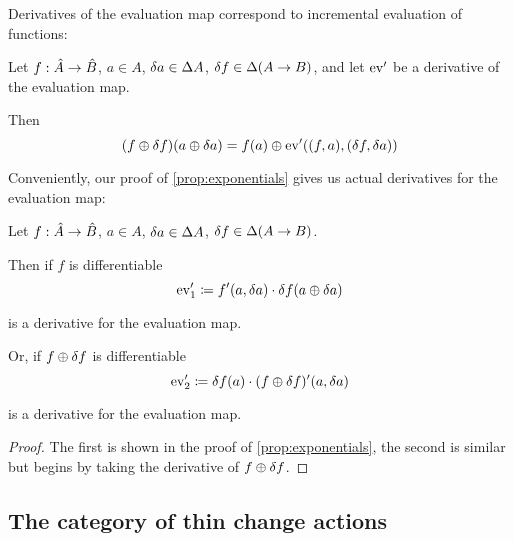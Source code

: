 Derivatives of the evaluation map correspond to incremental evaluation of functions:

\begin{prop}[Incrementalization]
\label{prop:incrementalization}
  Let $f: \hat{A} \rightarrow \hat{B}$, $a \in A$, $\delta a \in
  \Delta A$, $\delta f \in \Delta (A \rightarrow B)$, and let
  $\operatorname{ev}'$ be a derivative of the evaluation map.

  Then
  \begin{displaymath}
    (f \oplus \delta f)(a \oplus \delta a) = f(a) \oplus \operatorname{ev}'((f, a), (\delta f, \delta a))
  \end{displaymath}

\end{prop}

Conveniently, our proof of \cref{prop:exponentials} gives us actual derivatives for the evaluation map:

\begin{prop}
\label{prop:evDerivatives}
  Let $f: \hat{A} \rightarrow \hat{B}$, $a \in A$, $\delta a \in
  \Delta A$, $\delta f \in \Delta (A \rightarrow B)$.

  Then if $f$ is differentiable
  \begin{displaymath}
    \operatorname{ev}'_1 \coloneqq f'(a, \delta a) \cdot \delta f(a \oplus \delta a)
  \end{displaymath}
  
  is a derivative for the evaluation map.

  Or, if $f \oplus \delta f$ is differentiable
  \begin{displaymath}
    \operatorname{ev}'_2 \coloneqq \delta f(a) \cdot (f \oplus \delta f)'(a, \delta a)
  \end{displaymath}

  is a derivative for the evaluation map.
\end{prop}
\ifproofs
\begin{proof}
  The first is shown in the proof of \cref{prop:exponentials}, the second is
  similar but begins by taking the derivative of $f \oplus \delta f$.
\end{proof}
\fi

\subsection{The category of thin change actions}


